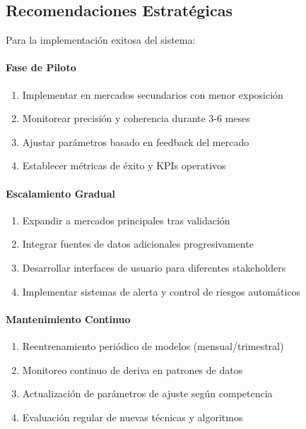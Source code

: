 \documentclass{article}
\begin{document}
\subsection{Recomendaciones Estratégicas}

Para la implementación exitosa del sistema:

\paragraph{Fase de Piloto}
\begin{enumerate}
    \item Implementar en mercados secundarios con menor exposición
    \item Monitorear precisión y coherencia durante 3-6 meses
    \item Ajustar parámetros basado en feedback del mercado
    \item Establecer métricas de éxito y KPIs operativos
\end{enumerate}

\paragraph{Escalamiento Gradual}
\begin{enumerate}
    \item Expandir a mercados principales tras validación
    \item Integrar fuentes de datos adicionales progresivamente
    \item Desarrollar interfaces de usuario para diferentes stakeholders
    \item Implementar sistemas de alerta y control de riesgos automáticos
\end{enumerate}

\paragraph{Mantenimiento Continuo}
\begin{enumerate}
    \item Reentrenamiento periódico de modelos (mensual/trimestral)
    \item Monitoreo continuo de deriva en patrones de datos
    \item Actualización de parámetros de ajuste según competencia
    \item Evaluación regular de nuevas técnicas y algoritmos
\end{enumerate}
\end{document}
